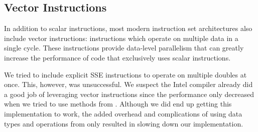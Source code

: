 \subsection{Vector Instructions}
In addition to scalar instructions, most modern instruction set architectures
also include vector instructions: instructions which operate on multiple
data in a single cycle. These instructions provide data-level parallelism that
can greatly increase the performance of code that exclusively uses scalar
instructions.

We tried to include explicit SSE instructions to operate on multiple doubles at
once. This, however, was unsuccessful. We suspect the Intel compiler already
did a good job of leveraging vector instructions since the performance only
decreased when we tried to use methods from . Although we did
end up getting this implementation to work, the added overhead and
complications of using data types and operations from  only
resulted in slowing down our implementation.
